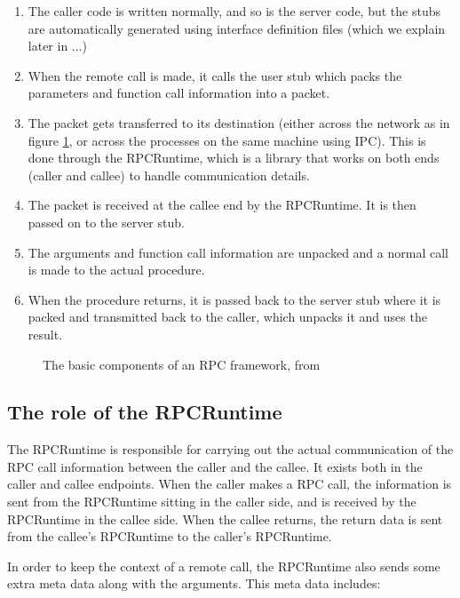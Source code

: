 \begin{enumerate}
  \item The caller code is written normally, and so is the server code, but the stubs are automatically generated using interface definition files (which we explain later in ...)
  \item When the remote call is made, it calls the user stub which packs the parameters and function call information into a packet.
  \item The packet gets transferred to its destination (either across the network as in figure \ref{fig:rpc-components}, or across the processes on the same machine using IPC). This is done through the RPCRuntime, which is a library that works on both ends (caller and callee) to handle communication details.
  \item The packet is received at the callee end by the RPCRuntime. It is then passed on to the server stub.
  \item The arguments and function call information are unpacked and a normal call is made to the actual procedure.
  \item When the procedure returns, it is passed back to the server stub where it is packed and transmitted back to the caller, which unpacks it and uses the result.
\end{enumerate}

\begin{figure}
    \centering
    \caption{The basic components of an RPC framework, from \cite{birrell1984implementing}}
    \label{fig:rpc-components}
\end{figure}

\subsection{The role of the RPCRuntime}
\label{RPCRuntimeBackgroundSection} 
The RPCRuntime is responsible for carrying out the actual communication of the RPC call information between the caller and the callee. It exists both in the caller and callee endpoints. When the caller makes a RPC call, the information is sent from the RPCRuntime sitting in the caller side, and is received by the RPCRuntime in the callee side. When the callee returns, the return data is sent from the callee's RPCRuntime to the caller's RPCRuntime.

In order to keep the context of a remote call, the RPCRuntime also sends some extra meta data along with the arguments. This meta data includes: 

